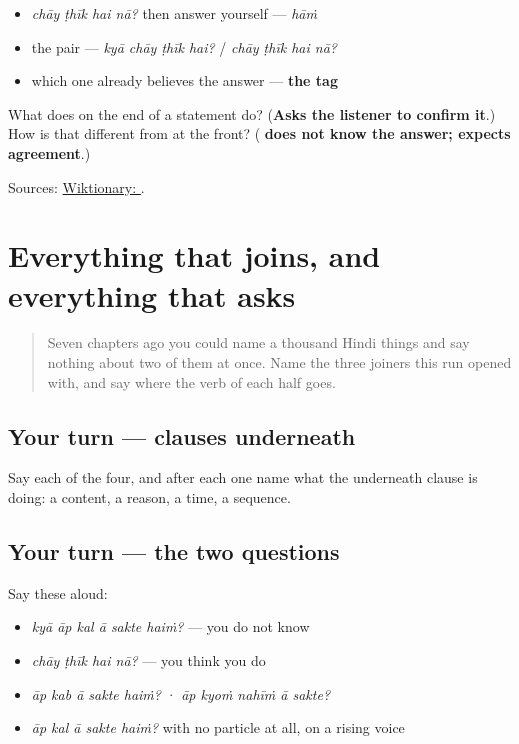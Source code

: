 \begin{itemize}
\raggedright
  \item \emph{chāy ṭhīk hai nā?} then answer yourself — \emph{hāṁ}
  \item the pair — \emph{kyā chāy ṭhīk hai?} / \emph{chāy ṭhīk hai nā?}
  \item which one already believes the answer — \textbf{the tag}
\end{itemize}

\begin{tcolorbox}[breakable,colback=teal!4,colframe=teal!35!black,title={Before you move on}]
What does \textbf{} on the end of a statement do? (\textbf{Asks the listener to confirm it}.) How is that different from \textbf{} at the front? (\textbf{ does not know the answer;  expects agreement}.)

Sources: \href{https://en.wiktionary.org/wiki/\%E0\%A4\%A8\%E0\%A4\%BE}{Wiktionary: }.
\end{tcolorbox}
\section[\texorpdfstring{\hi{क्या} …? · … \hi{ना}? … (kyā …? · … nā? …)}{क्या …? · … ना? … (kyā …? · … nā? …)}]{Everything that joins, and everything that asks}

\label{lesson:HI-R74-ask}



\begin{quote}
Seven chapters ago you could name a thousand Hindi things and say nothing about two of them at once. Name the three joiners this run opened with, and say where the verb of each half goes.
\end{quote}

\subsection*{Your turn — clauses underneath}
Say each of the four, and after each one name what the underneath clause is doing: a content, a reason, a time, a sequence.

\subsection*{Your turn — the two questions}
Say these aloud:

\begin{itemize}
\raggedright
  \item \emph{kyā āp kal ā sakte haiṁ?} — you do not know
  \item \emph{chāy ṭhīk hai nā?} — you think you do
  \item \emph{āp kab ā sakte haiṁ?} · \emph{āp kyoṁ nahīṁ ā sakte?}
  \item \emph{āp kal ā sakte haiṁ?} with no particle at all, on a rising voice
\end{itemize}

